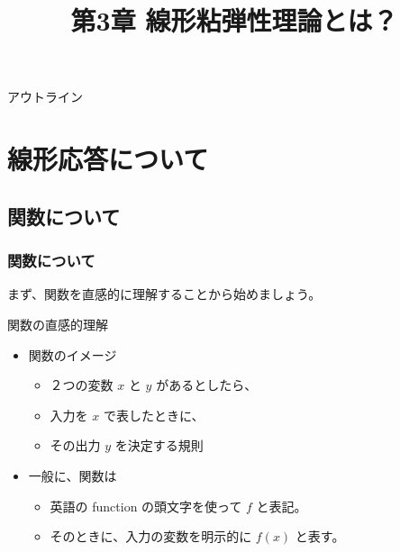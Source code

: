 \documentclass[unicode,12pt,aspectratio=169]{beamer}
\title{第3章 線形粘弾性理論とは？}
\date{\empty}
\begin{document}
\frame{\titlepage}
\begin{frame}{アウトライン}
    \tableofcontents
\end{frame}
\setcounter{framenumber}{0}

\section{線形応答について}
\subsection{関数について}
\begin{frame}
	\frametitle{関数について}
		まず、関数を直感的に理解することから始めましょう。
		\begin{block}{関数の直感的理解}
			\begin{itemize}
				\item 関数のイメージ
				\begin{itemize}
					\item ２つの変数 $x$ と $y$ があるとしたら、
					\item 入力を $x$ で表したときに、
					\item その出力 $y$ を決定する規則
				\end{itemize}
				\item 一般に、関数は
				\begin{itemize}
					\item 英語の function の頭文字を使って $f$ と表記。
					\item そのときに、入力の変数を明示的に $f(x)$ と表す。
				\end{itemize}
			\end{itemize}
		\end{block}
\end{frame}
\end{document}
